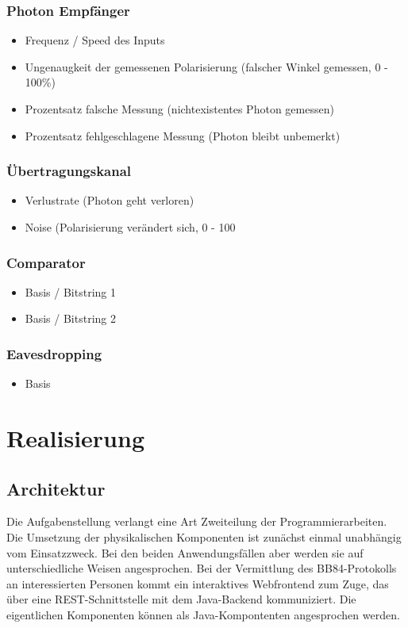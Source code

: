 \documentclass[a4paper,10.2pt,pdftex]{scrartcl}%
\begin{document}
\subsubsection*{ Photon Empfänger}
\begin{itemize}
\item  Frequenz / Speed des Inputs
\item  Ungenaugkeit der gemessenen Polarisierung (falscher Winkel gemessen, 0 - 100\%) 
\item  Prozentsatz falsche Messung (nichtexistentes Photon gemessen)
\item  Prozentsatz fehlgeschlagene Messung (Photon bleibt unbemerkt)
\end{itemize}
\subsubsection*{ Übertragungskanal}
\begin{itemize}
\item  Verlustrate (Photon geht verloren)
\item  Noise (Polarisierung verändert sich, 0 - 100%
\end{itemize}

\subsubsection*{ Comparator}
\begin{itemize}
\item Basis / Bitstring 1
\item Basis / Bitstring 2
\end{itemize}
\subsubsection*{ Eavesdropping}
\begin{itemize}
\item  Basis
\end{itemize}

\section{Realisierung}
\subsection{Architektur}
Die Aufgabenstellung verlangt eine Art Zweiteilung der Programmierarbeiten. Die Umsetzung der physikalischen Komponenten ist zunächst einmal unabhängig vom Einsatzzweck. Bei den beiden Anwendungsfällen aber werden sie auf unterschiedliche Weisen angesprochen. Bei der Vermittlung des BB84-Protokolls an interessierten Personen kommt ein interaktives Webfrontend zum Zuge, das über eine REST-Schnittstelle mit dem Java-Backend kommuniziert. Die eigentlichen Komponenten können als Java-Kompontenten angesprochen werden. 
\end{document}
